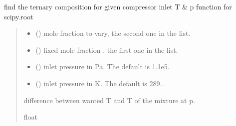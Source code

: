 \documentclass[letterpaper,10pt,english]{sphinxmanual}
\begin{document}
\begin{fulllineitems}
\label{\detokenize{mixture_search:mixture_search.find_comp}}
\pysigstartsignatures
{}
\pysigstopsignatures
\sphinxAtStartPar
find the ternary composition for given compressor inlet T \& p
function for scipy.root
\begin{quote}\begin{description}
\begin{itemize}
\item {} 
\sphinxAtStartPar
{} (\sphinxstyleliteralemphasis{\sphinxupquote{ (}}\sphinxstyleliteralemphasis{\sphinxupquote{)}}) \textendash{} mole fraction to vary, the second one in the list.

\item {} 
\sphinxAtStartPar
{} (\sphinxstyleliteralemphasis{\sphinxupquote{ (}}\sphinxstyleliteralemphasis{\sphinxupquote{)}}) \textendash{} fixed mole fraction , the first one in the list.

\item {} 
\sphinxAtStartPar
{} (\sphinxstyleliteralemphasis{\sphinxupquote{, }}) \textendash{} inlet pressure in Pa. The default is 1.1e5.

\item {} 
\sphinxAtStartPar
{} (\sphinxstyleliteralemphasis{\sphinxupquote{, }}) \textendash{} inlet pressure in K. The default is 289..

\end{itemize}

\sphinxAtStartPar
difference between wanted T and T of the mixture at p.

\sphinxAtStartPar
float

\end{description}\end{quote}

\end{fulllineitems}
\end{document}
